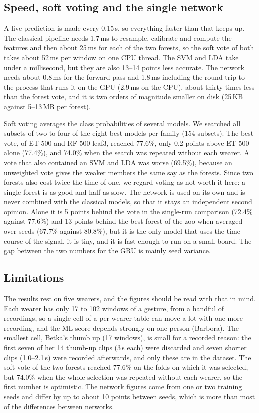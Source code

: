 \documentclass[conference]{IEEEtran}
\begin{document}
\subsection{Speed, soft voting and the single network}
A live prediction is made every 0.15\,s, so everything faster than that keeps up. The
classical pipeline needs 1.7\,ms to resample, calibrate and compute the features and
then about 25\,ms for each of the two forests, so the soft vote of both takes about
52\,ms per window on one CPU thread. The SVM and LDA take under a millisecond, but
they are also 13--14 points less accurate. The network needs about 0.8\,ms for the
forward pass and 1.8\,ms including the round trip to the process that runs it on the
GPU (2.9\,ms on the CPU), about thirty times less than the forest vote, and it is two
orders of magnitude smaller on disk (25\,KB against 5--13\,MB per forest).

Soft voting averages the class probabilities of several models. We searched all
subsets of two to four of the eight best models per family (154 subsets). The best
vote, of ET-500 and RF-500-leaf3, reached 77.6\%, only 0.2 points above ET-500 alone
(77.4\%), and 74.0\% when the search was repeated without each wearer. A vote that
also contained an SVM and LDA was worse (69.5\%), because an unweighted vote gives
the weaker members the same say as the forests. Since two forests also cost twice the
time of one, we regard voting as not worth it here: a single forest is as good and
half as slow. The network is used on its own and is never combined with the classical
models, so that it stays an independent second opinion. Alone it is 5 points behind the
vote in the single-run comparison (72.4\% against 77.6\%) and 13 points behind the best
forest of the zoo when averaged over seeds (67.7\% against 80.8\%), but it is the only
model that uses the time course of the signal, it is tiny, and it is fast enough to run
on a small board. The gap between the two numbers for the GRU is mainly seed
variance.

\subsection{Limitations}
The results rest on five wearers, and the figures should be read with that in mind.
Each wearer has only 17 to 102 windows of a gesture, from a handful of recordings, so
a single cell of a per-wearer table can move a lot with one more recording, and
the ML score depends strongly on one person (Barbora). The smallest cell, Betka's
thumb up (17 windows), is small for a recorded reason: the first seven of her 14
thumb-up clips (3\,s each) were discarded and seven shorter clips (1.0--2.1\,s) were
recorded afterwards, and only these are in the dataset. The soft vote of the two forests
reached 77.6\% on the folds on which it was selected, but 74.0\% when the whole
selection was repeated without each wearer, so the first number is optimistic. The
network figures come from one or two training seeds and differ by up to about 10
points between seeds, which is more than most of the differences between networks.
\end{document}
